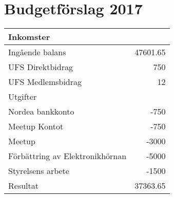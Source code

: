 \documentclass[a4paper,11pt,oneside]{article}
\begin{document}
\section{Budgetförslag 2017}

\begin{tabular}{lr}
  \toprule
  Inkomster & \\
  \midrule
  Ingående balans & 47601.65\\
  UFS Direktbidrag & 750\\
  UFS Medlemsbidrag & 12\\
  \midrule
  Utgifter & \\
  \midrule
  Nordea bankkonto & -750\\
  Meetup Kontot & -750\\
  Meetup & -3000\\
  Förbättring av Elektronikhörnan & -5000\\
  Styrelsens arbete & -1500\\
  \midrule
  Resultat & 37363.65\\
  \bottomrule
\end{tabular}
\end{document}

